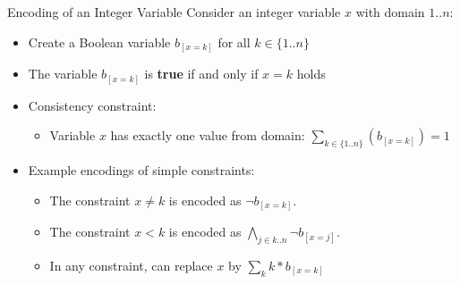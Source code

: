 \documentclass{cons-beamer}
\begin{document}
\begin{frame}{ Encoding of an Integer Variable}
  Consider an integer variable $x$ with domain $1..n$: \vfill
  \begin{itemize}
    \item Create a Boolean variable $b_{[x=k]}$ for all $k \in \{1..n\}$
      \vfill
    \item The variable $b_{[x=k]}$ is \textbf{true} if and only if
      $x = k$ holds \vfill
    \item Consistency constraint: \vfill
      \begin{itemize}
          \item Variable $x$ has exactly one value from domain: $\sum_{k \in \{1..n\}} (b_{[x=k]}) = 1$\vfill
      \end{itemize} \vfill
    \item Example encodings of simple constraints:
      \begin{itemize}
        \item The constraint $x \neq k$ is encoded as $\lnot b_{[x=k]}$.
          \vfill
        \item The constraint $x < k$ is encoded as
          $\displaystyle\bigwedge_{j \in k..n} \lnot b_{[x=j]}$.
        \item In any constraint, can replace $x$ by $\sum_k k*b_{[x=k]}$
      \end{itemize}
  \end{itemize}
\end{frame}
\end{document}

